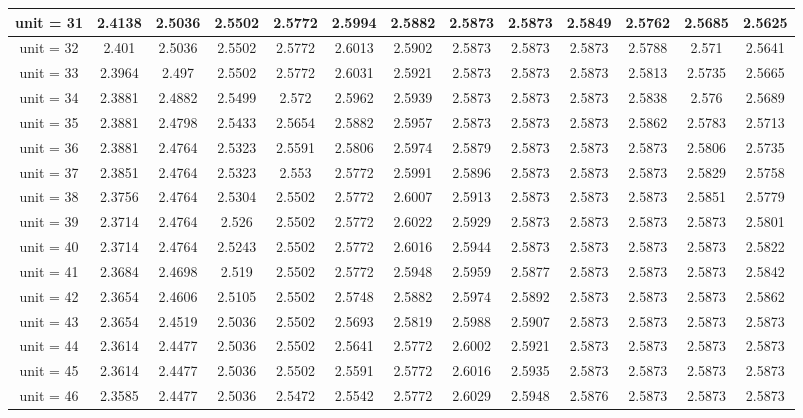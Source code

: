 \begin{table*}[ht]
\begin{tabular}{|c|c|c|c|c|c|c|c|c|c|c|c|c|}
\hline
unit = 31 &
2.4138 & 2.5036 & 2.5502 & 2.5772 & 2.5994 & 2.5882 & 2.5873 & 2.5873 & 2.5849 & 2.5762 & 2.5685 & 2.5625 \\
\hline
unit = 32 &
2.401 & 2.5036 & 2.5502 & 2.5772 & 2.6013 & 2.5902 & 2.5873 & 2.5873 & 2.5873 & 2.5788 & 2.571 & 2.5641 \\
\hline
unit = 33 &
2.3964 & 2.497 & 2.5502 & 2.5772 & 2.6031 & 2.5921 & 2.5873 & 2.5873 & 2.5873 & 2.5813 & 2.5735 & 2.5665 \\
\hline
unit = 34 &
2.3881 & 2.4882 & 2.5499 & 2.572 & 2.5962 & 2.5939 & 2.5873 & 2.5873 & 2.5873 & 2.5838 & 2.576 & 2.5689 \\
\hline
unit = 35 &
2.3881 & 2.4798 & 2.5433 & 2.5654 & 2.5882 & 2.5957 & 2.5873 & 2.5873 & 2.5873 & 2.5862 & 2.5783 & 2.5713 \\
\hline
unit = 36 &
2.3881 & 2.4764 & 2.5323 & 2.5591 & 2.5806 & 2.5974 & 2.5879 & 2.5873 & 2.5873 & 2.5873 & 2.5806 & 2.5735 \\
\hline
unit = 37 &
2.3851 & 2.4764 & 2.5323 & 2.553 & 2.5772 & 2.5991 & 2.5896 & 2.5873 & 2.5873 & 2.5873 & 2.5829 & 2.5758 \\
\hline
unit = 38 &
2.3756 & 2.4764 & 2.5304 & 2.5502 & 2.5772 & 2.6007 & 2.5913 & 2.5873 & 2.5873 & 2.5873 & 2.5851 & 2.5779 \\
\hline
unit = 39 &
2.3714 & 2.4764 & 2.526 & 2.5502 & 2.5772 & 2.6022 & 2.5929 & 2.5873 & 2.5873 & 2.5873 & 2.5873 & 2.5801 \\
\hline
unit = 40 &
2.3714 & 2.4764 & 2.5243 & 2.5502 & 2.5772 & 2.6016 & 2.5944 & 2.5873 & 2.5873 & 2.5873 & 2.5873 & 2.5822 \\
\hline
unit = 41 &
2.3684 & 2.4698 & 2.519 & 2.5502 & 2.5772 & 2.5948 & 2.5959 & 2.5877 & 2.5873 & 2.5873 & 2.5873 & 2.5842 \\
\hline
unit = 42 &
2.3654 & 2.4606 & 2.5105 & 2.5502 & 2.5748 & 2.5882 & 2.5974 & 2.5892 & 2.5873 & 2.5873 & 2.5873 & 2.5862 \\
\hline
unit = 43 &
2.3654 & 2.4519 & 2.5036 & 2.5502 & 2.5693 & 2.5819 & 2.5988 & 2.5907 & 2.5873 & 2.5873 & 2.5873 & 2.5873 \\
\hline
unit = 44 &
2.3614 & 2.4477 & 2.5036 & 2.5502 & 2.5641 & 2.5772 & 2.6002 & 2.5921 & 2.5873 & 2.5873 & 2.5873 & 2.5873 \\
\hline
unit = 45 &
2.3614 & 2.4477 & 2.5036 & 2.5502 & 2.5591 & 2.5772 & 2.6016 & 2.5935 & 2.5873 & 2.5873 & 2.5873 & 2.5873 \\
\hline
unit = 46 &
2.3585 & 2.4477 & 2.5036 & 2.5472 & 2.5542 & 2.5772 & 2.6029 & 2.5948 & 2.5876 & 2.5873 & 2.5873 & 2.5873 \\

\end{tabular}
\end{table*}
